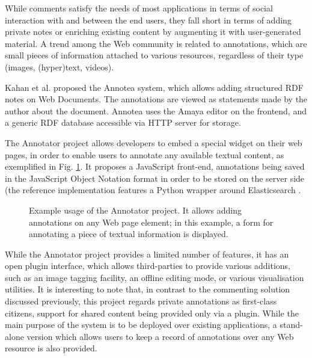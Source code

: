 While comments satisfy the needs of most applications in terms of social
interaction with and between the end users, they fall short in terms of adding
private notes or enriching existing content by augmenting it with
user-generated material. A trend among the Web community is related to
annotations, which are small pieces of information attached to various
resources, regardless of their type (images, (hyper)text, videos).

Kahan et al.\cite{ref:annotea} proposed the Annotea system, which allows adding
structured RDF notes on Web Documents. The annotations are viewed as statements
made by the author about the document. Annotea uses the Amaya \cite{ref:amaya}
editor on the frontend, and a generic RDF database accessible via HTTP server
for storage.

The Annotator project \cite{ref:annotator} allows developers to embed a special
widget on their web pages, in order to enable users to annotate any available
textual content, as exemplified in Fig. \ref{fig:annotator}.  It proposes a
JavaScript front-end, annotations being saved in the JavaScript Object Notation
format in order to be stored on the server side (the reference implementation
features a Python wrapper around Elasticsearch \cite{ref:elasearch}.

\begin{figure}[!ht]
  \centering
  \caption[Example usage of the Annotator project]
          {Example usage of the Annotator project. It allows
           adding annotations on any Web page element; in this example, a form
           for annotating a piece of textual information is displayed.}
  \label{fig:annotator}
\end{figure}

While the Annotator project provides a limited number of features, it has an
open plugin interface, which allows third-parties to provide various additions,
such as an image tagging facility, an offline editing mode, or various
visualisation utilities. It is interesting to note that, in contrast to the
commenting solution discussed previously, this project regards private
annotations as first-class citizens, support for shared content being provided
only via a plugin. While the main purpose of the system is to be deployed over
existing applications, a stand-alone version which allows users to keep a
record of annotations over any Web resource is also provided.


